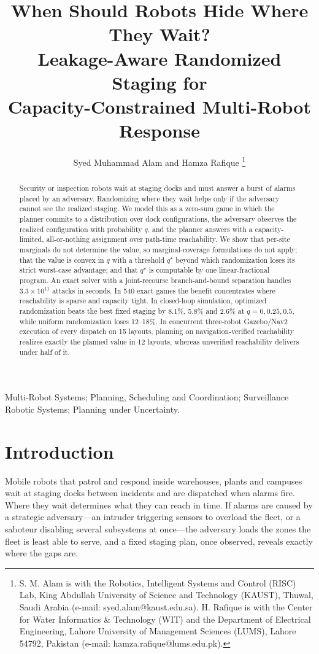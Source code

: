 \documentclass[letterpaper,journal]{IEEEtran}
\title{When Should Robots Hide Where They Wait?\\ Leakage-Aware Randomized Staging for\\ Capacity-Constrained Multi-Robot Response}
\author{Syed Muhammad Alam and Hamza Rafique%
\thanks{S. M. Alam is with the Robotics, Intelligent Systems and Control (RISC) Lab, King Abdullah University of Science and Technology (KAUST), Thuwal, Saudi Arabia (e-mail: syed.alam@kaust.edu.sa). H. Rafique is with the Center for Water Informatics \& Technology (WIT) and the Department of Electrical Engineering, Lahore University of Management Sciences (LUMS), Lahore 54792, Pakistan (e-mail: hamza.rafique@lums.edu.pk).}}
\theoremstyle{remark}
\begin{document}
\maketitle
\thispagestyle{empty}\pagestyle{empty}  %

\begin{abstract}
Security or inspection robots wait at staging docks and must answer a burst of alarms placed by an adversary. Randomizing where they wait helps only if the adversary cannot see the realized staging. We model this as a zero-sum game in which the planner commits to a distribution over dock configurations, the adversary observes the realized configuration with probability $q$, and the planner answers with a capacity-limited, all-or-nothing assignment over path-time reachability. We show that per-site marginals do not determine the value, so marginal-coverage formulations do not apply; that the value is convex in $q$ with a threshold $q^\star$ beyond which randomization loses its strict worst-case advantage; and that $q^\star$ is computable by one linear-fractional program. An exact solver with a joint-recourse branch-and-bound separation handles $3.3\times10^{11}$ attacks in seconds. In 540 exact games the benefit concentrates where reachability is sparse and capacity tight. In closed-loop simulation, optimized randomization beats the best fixed staging by 8.1\%, 5.8\% and 2.6\% at $q=0,0.25,0.5$, while uniform randomization loses 12--18\%. In concurrent three-robot Gazebo/Nav2 execution of every dispatch on 15 layouts, planning on navigation-verified reachability realizes exactly the planned value in 12 layouts, whereas unverified reachability delivers under half of it.
\end{abstract}

\begin{IEEEkeywords}
Multi-Robot Systems; Planning, Scheduling and Coordination; Surveillance Robotic Systems; Planning under Uncertainty.
\end{IEEEkeywords}

\section{Introduction}
Mobile robots that patrol and respond inside warehouses, plants and campuses wait at staging docks between incidents and are dispatched when alarms fire. Where they wait determines what they can reach in time. If alarms are caused by a strategic adversary---an intruder triggering sensors to overload the fleet, or a saboteur disabling several subsystems at once---the adversary loads the zones the fleet is least able to serve, and a fixed staging plan, once observed, reveals exactly where the gaps are.
\end{document}
